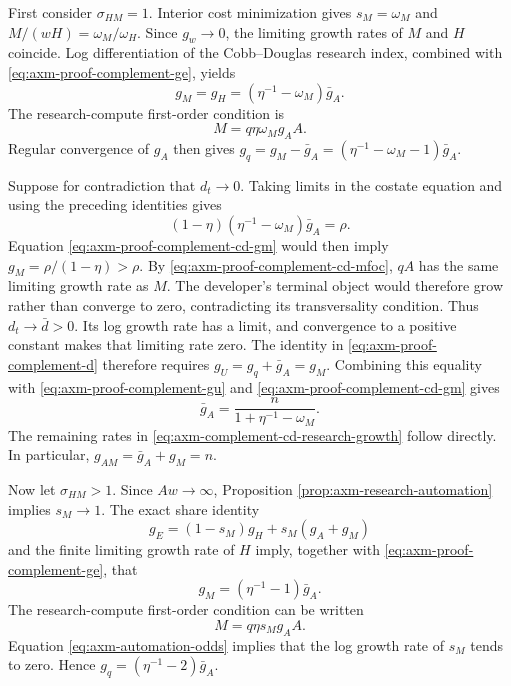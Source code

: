 First consider \(\sigma_{HM}=1\). Interior cost minimization gives
\(s_M=\omega_M\) and \(M/(wH)=\omega_M/\omega_H\). Since \(g_w\to0\), the
limiting growth rates of \(M\) and \(H\) coincide. Log differentiation of the
Cobb--Douglas research index, combined with
\eqref{eq:axm-proof-complement-ge}, yields
\begin{equation}
 g_M=g_H=(\eta^{-1}-\omega_M)\bar g_A.
 \label{eq:axm-proof-complement-cd-gm}
\end{equation}
The research-compute first-order condition is
\begin{equation}
 M=q\eta\omega_M g_AA.
 \label{eq:axm-proof-complement-cd-mfoc}
\end{equation}
Regular convergence of \(g_A\) then gives
\(g_q=g_M-\bar g_A=(\eta^{-1}-\omega_M-1)\bar g_A\).

Suppose for contradiction that \(d_t\to0\). Taking limits in the costate
equation and using the preceding identities gives
\[
 (1-\eta)(\eta^{-1}-\omega_M)\bar g_A=\rho.
\]
Equation \eqref{eq:axm-proof-complement-cd-gm} would then imply
\(g_M=\rho/(1-\eta)>\rho\). By
\eqref{eq:axm-proof-complement-cd-mfoc}, \(qA\) has the same limiting growth
rate as \(M\). The developer's terminal object would therefore grow rather than
converge to zero, contradicting its transversality condition. Thus
\(d_t\to\bar d>0\). Its log growth rate has a limit, and convergence to a
positive constant makes that limiting rate zero. The identity in
\eqref{eq:axm-proof-complement-d} therefore requires
\(g_U=g_q+\bar g_A=g_M\). Combining this equality with
\eqref{eq:axm-proof-complement-gu} and
\eqref{eq:axm-proof-complement-cd-gm} gives
\[
 \bar g_A=\frac{n}{1+\eta^{-1}-\omega_M}.
\]
The remaining rates in \eqref{eq:axm-complement-cd-research-growth} follow
directly. In particular, \(g_{AM}=\bar g_A+g_M=n\).

Now let \(\sigma_{HM}>1\). Since \(Aw\to\infty\), Proposition
\ref{prop:axm-research-automation} implies \(s_M\to1\). The exact share identity
\[
 g_E=(1-s_M)g_H+s_M(g_A+g_M)
\]
and the finite limiting growth rate of \(H\) imply, together with
\eqref{eq:axm-proof-complement-ge}, that
\begin{equation}
 g_M=(\eta^{-1}-1)\bar g_A.
 \label{eq:axm-proof-complement-ces-gm}
\end{equation}
The research-compute first-order condition can be written
\begin{equation}
 M=q\eta s_Mg_AA.
 \label{eq:axm-proof-complement-ces-mfoc}
\end{equation}
Equation \eqref{eq:axm-automation-odds} implies that the log growth rate of
\(s_M\) tends to zero. Hence
\(g_q=(\eta^{-1}-2)\bar g_A\).

